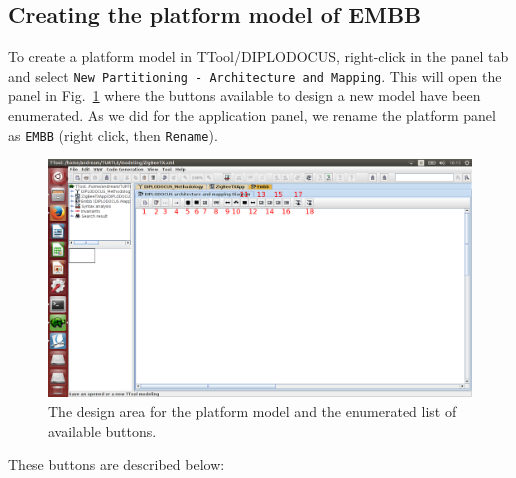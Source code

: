 \documentclass{llncs}
\newcommand{\screenshotsize}{1.0\textwidth}
\begin{document}
\subsection{Creating the platform model of EMBB}
\label{subsec:Create-Embb}
%
To create a platform model in TTool/DIPLODOCUS, right-click in the panel tab and select \texttt{New Partitioning -
Architecture and Mapping}. This will open the panel in Fig.~\ref{fig:Platform} where the buttons available to design a
new model have been enumerated. As we did for the application panel, we rename the platform panel as \texttt{EMBB}
(right click, then \texttt{Rename}).
%
\begin{figure}[!htbp]
	\centering
	\includegraphics[width=\screenshotsize]{figures/screenshot/Platform.png}
	\caption{The design area for the platform model and the enumerated list of available buttons.}
 	\label{fig:Platform}
\end{figure}
%
These buttons are described below:
%
\end{document}
